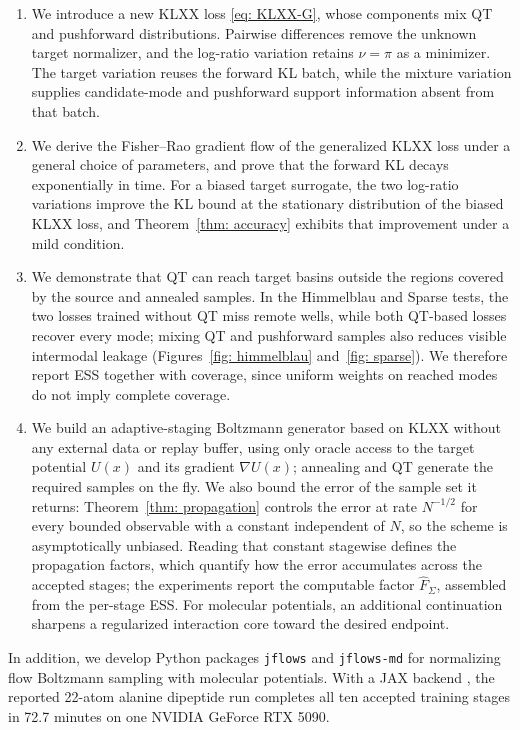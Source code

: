 \documentclass{article}
\begin{document}
\begin{enumerate}
	\setlength{\itemsep}{0pt}
	\item We introduce a new KLXX loss \eqref{eq: KLXX-G}, whose components mix QT and pushforward distributions. Pairwise differences remove the unknown target normalizer, and the log-ratio variation retains $\nu=\pi$ as a minimizer. The target variation reuses the forward KL batch, while the mixture variation supplies candidate-mode and pushforward support information absent from that batch.

	\item We derive the Fisher--Rao gradient flow of the generalized KLXX loss under a general choice of parameters, and prove that the forward KL decays exponentially in time. For a biased target surrogate, the two log-ratio variations improve the KL bound at the stationary distribution of the biased KLXX loss, and Theorem~\ref{thm: accuracy} exhibits that improvement under a mild condition.

	\item We demonstrate that QT can reach target basins outside the regions covered by the source and annealed samples. In the Himmelblau and Sparse tests, the two losses trained without QT miss remote wells, while both QT-based losses recover every mode; mixing QT and pushforward samples also reduces visible intermodal leakage (Figures~\ref{fig: himmelblau} and~\ref{fig: sparse}). We therefore report ESS together with coverage, since uniform weights on reached modes do not imply complete coverage.

	\item We build an adaptive-staging Boltzmann generator based on KLXX without any external data or replay buffer, using only oracle access to the target potential $U(x)$ and its gradient $\nabla U(x)$; annealing and QT generate the required samples on the fly. We also bound the error of the sample set it returns: Theorem~\ref{thm: propagation} controls the error at rate $N^{-1/2}$ for every bounded observable with a constant independent of $N$, {\color{purple}so the scheme is asymptotically unbiased}. Reading that constant stagewise defines the propagation factors, which quantify how the error accumulates across the accepted stages; the experiments report the computable factor $\hat F_\Sigma$, assembled from the per-stage ESS. For molecular potentials, an additional continuation sharpens a regularized interaction core toward the desired endpoint.
\end{enumerate}
In addition, we develop Python packages \texttt{jflows} and \texttt{jflows-md} for normalizing flow Boltzmann sampling with molecular potentials. With a JAX backend \citep{jax2018github}, the reported 22-atom alanine dipeptide run completes all ten accepted training stages in 72.7 minutes on one NVIDIA GeForce RTX 5090.
\end{document}
